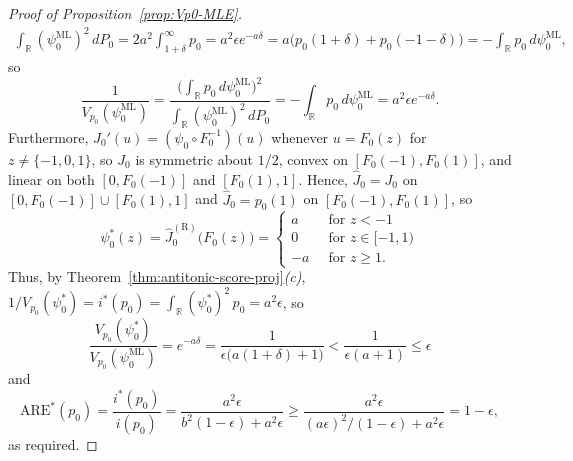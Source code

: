 \documentclass[a4paper]{article}
\newcommand{\R}{\mathbb{R}}
\theoremstyle{definition}
\begin{document}
\begin{proof}[Proof of Proposition~\ref{prop:Vp0-MLE}]
\begin{align*}
\int_\R (\psi_0^{\mathrm{ML}})^2\,dP_0 = 2a^2\int_{1+\delta}^\infty p_0 = a^2\epsilon e^{-a\delta} = a\bigl(p_0(1 + \delta) + p_0(-1 - \delta)\bigr) = -\int_\R p_0 \,d\psi_0^{\mathrm{ML}},
\end{align*}
so 
\[
\frac{1}{V_{p_0}(\psi_0^{\mathrm{ML}})} = \frac{\bigl(\int_\R p_0 \,d\psi_0^{\mathrm{ML}}\bigr)^2}{\int_\R (\psi_0^{\mathrm{ML}})^2\,dP_0} = -\int_\R p_0\,d\psi_0^{\mathrm{ML}} = a^2\epsilon e^{-a\delta}.
\]
Furthermore, $J_0'(u) = (\psi_0 \circ F_0^{-1})(u)$ whenever $u = F_0(z)$ for $z \neq \{-1,0,1\}$, so $J_0$ is symmetric about $1/2$, convex on $[F_0(-1),F_0(1)]$, and linear on both $[0,F_0(-1)]$ and $[F_0(1),1]$. Hence, $\hat{J}_0 = J_0$ on $[0,F_0(-1)] \cup [F_0(1),1]$ and $\hat{J}_0 = p_0(1)$ on $[F_0(-1),F_0(1)]$, so
\[
\psi_0^*(z) = \hat{J}_0^{(\mathrm{R})}\bigl(F_0(z)\bigr) =
\begin{cases}
a \;\;&\text{for }z < -1 \\
0 \;\;&\text{for }z \in [-1,1) \\
-a \;\;&\text{for }z \geq 1.
\end{cases}
\]
Thus, by Theorem~\ref{thm:antitonic-score-proj}\textit{(c)}, $1/V_{p_0}(\psi_0^*) = i^*(p_0) = \int_\R (\psi_0^*)^2\,p_0 = a^2\epsilon$,
so
\[
\frac{V_{p_0}(\psi_0^*)}{V_{p_0}(\psi_0^{\mathrm{ML}})} = e^{-a\delta} = \frac{1}{\epsilon\bigl(a(1 + \delta) + 1\bigr)} < \frac{1}{\epsilon(a + 1)} \leq \epsilon
\]
and
\[
\mathrm{ARE}^*(p_0) = \frac{i^*(p_0)}{i(p_0)} = \frac{a^2\epsilon}{b^2(1 - \epsilon) + a^2\epsilon} \geq 
\frac{a^2\epsilon}{(a\epsilon)^2/(1 - \epsilon) + a^2\epsilon} = 1 - \epsilon,
\]
as required.
\end{proof}
\end{document}
